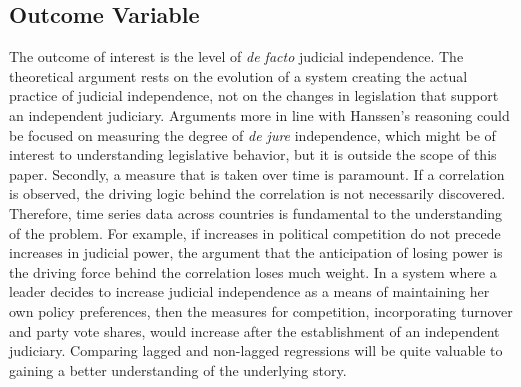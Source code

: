 \documentclass[12pt]{article}
\begin{document}
\subsection*{Outcome Variable}
The outcome of interest is the level of \textit{de facto} judicial independence. The theoretical argument rests on the evolution of a system creating the actual practice of judicial independence, not on the changes in legislation that support an independent judiciary. Arguments more in line with Hanssen's reasoning could be focused on measuring the degree of \textit{de jure} independence, which might be of interest to understanding legislative behavior, but it is outside the scope of this paper. Secondly, a measure that is taken over time is paramount. If a correlation is observed, the driving logic behind the correlation is not necessarily discovered. Therefore, time series data across countries is fundamental to the understanding of the problem. For example, if increases in political competition do not precede increases in judicial power, the argument that the anticipation of losing power is the driving force behind the correlation loses much weight. In a system where a leader decides to increase judicial independence as a means of maintaining her own policy preferences, then the measures for competition, incorporating turnover and party vote shares, would increase after the establishment of an independent judiciary. Comparing lagged and non-lagged regressions will be quite valuable to gaining a better understanding of the underlying story.
\end{document}
